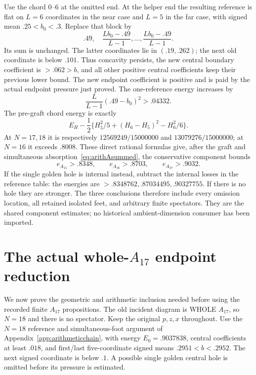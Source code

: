 \documentclass[11pt]{article}
\begin{document}
Use the chord \(0\)--\(6\) at the omitted end.
At the helper end the resulting reference is flat on \(L=6\)
coordinates in the near case and \(L=5\) in the far case,
with signed mean \(.25<b_0<.3\).
Replace that block by
\[
             .49,\quad
             {\frac{Lb_0-.49}{L-1}},\ldots,
             {\frac{Lb_0-.49}{L-1}}.
\]
Its sum is unchanged.  The latter coordinates lie in
\((.19,.262)\); the next old coordinate is below \(.101\).
Thus concavity persists, the new central boundary coefficient
is \(>.062>b\), and all other positive central coefficients
keep their previous lower bound.
The new endpoint coefficient is positive and is paid by the
actual endpoint pressure just proved.
The one-reference energy increases by
\[
                {\frac{L}{L-1}}(.49-b_0)^2>.04332 .
\]
The pre-graft chord energy is exactly
\[
 E_H-\frac12\{H_5^2/5+(H_6-H_5)^2-H_6^2/6\}.
\]
At \(N=17,18\) it is respectively
\(12569249/15000000\) and \(13079276/15000000\);
at \(N=16\) it exceeds \(.8008\).
These direct rational formulas give, after the graft and
simultaneous absorption~\eqref{eq:arithAsummed}, the conservative
component bounds
\[
                 e_{A_{15}}>.8348,\qquad
                 e_{A_{16}}>.8703,\qquad
                 e_{A_{17}}>.9032 .
\]
If the single golden hole is internal instead, subtract the
internal losses in the reference table:
the energies are \(>.8348762,.87034495,.90327755\).
If there is no hole they are stronger.
The three conclusions therefore include every omission location,
all retained isolated feet, and arbitrary finite spectators.
They are the shared component estimates; no historical
ambient-dimension consumer has been imported.

\section[The actual whole-A17 endpoint reduction]{The actual whole-\(A_{17}\) endpoint reduction}
\label{app:wholearithA17}

We now prove the geometric and arithmetic inclusion needed before
using the recorded finite \(A_{17}\) propositions.
The old incident diagram is WHOLE \(A_{17}\), so \(N=18\) and
there is no spectator.
Keep the original \(p,z,x\) throughout.
Use the \(N=18\) reference and simultaneous-foot argument of
Appendix~\ref{app:arithmeticchain}, with energy
\(E_0=.9037838\), central coefficients at least \(.018\),
and first/last five-coordinate signed means
\(.2951<b<.2952\).
The next signed coordinate is below \(.1\).
A possible single golden central hole is omitted before its
pressure is estimated.
\end{document}
